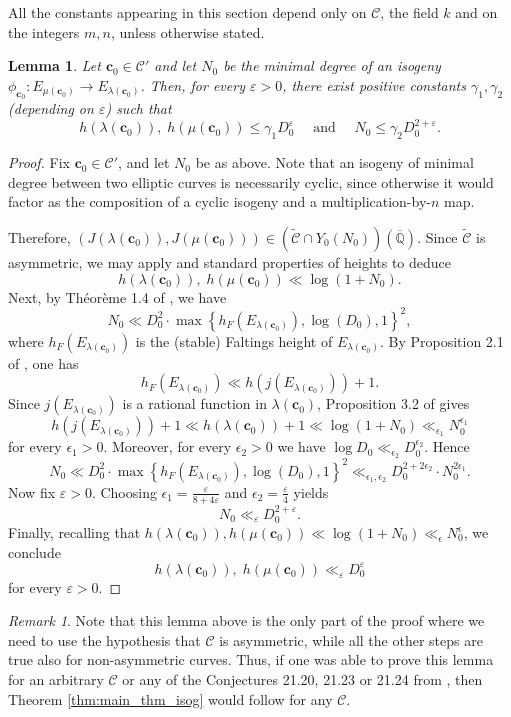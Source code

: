 \documentclass[11pt,a4paper,reqno]{amsart}
\numberwithin{equation}{section}
\newcommand{\Qal}{\overline{\mathbb{Q}}}
\renewcommand{\c}{\mathcal{C}}
\newcommand{\cc}{\mathbf{c}}
\newcommand{\g}{\gamma}
\newcommand{\eps}{\varepsilon}
\renewcommand{\l}{\lambda}
\newcommand{\m}{\mu}
\newcommand{\pt}[1]{\left( #1 \right)}
\newcommand{\pg}[1]{\left\lbrace #1 \right\rbrace}
\newtheorem{lemma}[theorem]{Lemma}
\theoremstyle{remark}
\newtheorem{remark}[theorem]{Remark}
\theoremstyle{definition}
\theoremstyle{definition}
\begin{document}
All the constants appearing in this section depend only on $\c$, the field $k$ and on the integers $m, n$, unless otherwise stated.

\begin{lemma}\label{lemma_bounds}
Let $\cc_0 \in \c'$ and let $N_0$ be the minimal degree of an isogeny $\phi_{\cc_0}: E_{\m(\cc_0)} \rightarrow E_{\l(\cc_0)}$. Then, for every $\eps>0$, there exist positive constants $\g_1, \g_2$ (depending on $\eps$) such that
$$h(\l(\cc_0)),\; h(\m(\cc_0)) \leq \g_1 D_0^{\eps} \quad \text{ and } \quad N_0 \leq \g_2 D_0^{2+\eps}.$$
\end{lemma}
\begin{proof}
Fix $\cc_0 \in \c'$, and let $N_0$ be as above. Note that an isogeny of minimal degree between two elliptic curves is necessarily cyclic, since otherwise it would factor as the composition of a cyclic isogeny and a multiplication-by-$n$ map.

Therefore, $(J(\l(\cc_0)), J(\m(\cc_0))) \in (\widetilde{\c} \cap Y_0(N_0))(\Qal)$. 
Since $\widetilde{\c}$ is asymmetric, we may apply \cite[Theorem~1.1]{Hab10} and standard properties of heights to deduce
$$h(\l(\cc_0)),\; h(\m(\cc_0)) \ll \log(1+N_0).$$
Next, by Théorème 1.4 of \cite{GR14}, we have
$$N_0 \ll D_0^2 \cdot \max\pg{h_{F}(E_{\l(\cc_0)}), \log(D_0),1}^2,$$
where $h_{F}(E_{\l(\cc_0)})$ is the (stable) Faltings height of $E_{\l(\cc_0)}$. By Proposition 2.1 of \cite{Sil86}, one has
$$h_F(E_{\l(\cc_0)}) \ll h\pt{j(E_{\l(\cc_0)})}+1.$$
Since $j(E_{\l(\cc_0)})$ is a rational function in $\l(\cc_0)$, Proposition 3.2 of \cite{Zan14} gives
$$h\pt{j(E_{\l(\cc_0)})}+1 \ll h(\l(\cc_0))+1 \ll \log(1+N_0) \ll_{\epsilon_1} N_0^{\epsilon_1}$$
for every $\epsilon_1 >0$.
Moreover, for every $\epsilon_2 >0$ we have $\log D_0 \ll_{\epsilon_2} D_0^{\epsilon_2}$. Hence
$$N_0 \ll D_0^2 \cdot \max\pg{h_{F}(E_{\l(\cc_0)}), \log(D_0),1}^2\ll_{\epsilon_1, \epsilon_2} D_0^{2+2\epsilon_2} \cdot N_0^{2\epsilon_1}.$$
Now fix $\eps>0$. Choosing $\epsilon_1 = \frac{\eps}{8+4\eps}$ and $\epsilon_2 = \frac{\eps}{4}$ yields
$$N_0 \ll_{\eps} D_0^{2+\eps}.$$
Finally, recalling that $h(\l(\cc_0)), h(\m(\cc_0)) \ll \log(1+N_0) \ll_\epsilon N_0^\epsilon$, we conclude
$$h(\l(\cc_0)),\; h(\m(\cc_0)) \ll_\eps D_0^\eps$$
for every $\eps>0$.
\end{proof}

\begin{remark}\label{rmk_asym}
Note that this lemma above is the only part of the proof where we need to use the hypothesis that $\c$ is asymmetric, while all the other steps are true also for non-asymmetric curves. Thus, if one was able to prove this lemma for an arbitrary $\c$ or any of the Conjectures 21.20, 21.23 or 21.24 from \cite{Pil22}, then Theorem \ref{thm:main_thm_isog} would follow for any $\c$.
\end{remark}
\end{document}
